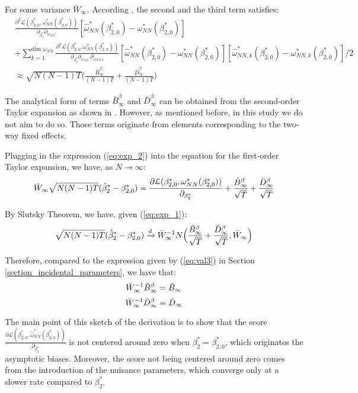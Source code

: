 For some variance $\bar{W}_\infty$. According \cite{fernandez2016individual}, the second and the third term satisfies:
\begin{align} \label{eq:exp_2}
    &\frac{\partial^2 \mathcal{L} ({\beta}_{2,0}^*, {\omega}_{NN}^*(\beta_{2,0}^*)) }{\partial_{\beta_{2}^*}\partial_{\omega_{NN}'} }[ \hat{\omega}_{NN}^* (\beta_{2,0}^*) - \omega_{NN}^* (\beta_{2,0}^*)]  \nonumber\\
    &+ \sum_{k = 1}^{\text{dim } \omega_{NN}} \frac{\partial^3 \mathcal{L} ({\beta}_{2,0}^*, {\omega}_{NN}^*(\beta_{2,0}^*))}{\partial_{\beta_{2}^*}\partial_{\omega_{NN}'}\partial_{\omega_{NN,k}}}[ \hat{\omega}_{NN}^* (\beta_{2,0}^*) - \omega_{NN}^* (\beta_{2,0}^*)] [ \hat{\omega}_{NN,k}^* (\beta_{2,0}^*) - \omega_{NN,k}^* (\beta_{2,0}^*)] / 2 \nonumber \\
    & \approx \sqrt{N(N-1)T} \Big( \frac{\bar{B}^\beta_\infty}{(N-1)T} + \frac{\bar{D}^\beta_\infty}{(N-1)T} \Big)
\end{align}

The analytical form of terms $\bar{B}^\beta_\infty$ and $\bar{D}^\beta_\infty$ can be obtained from the second-order Taylor expansion as shown in \cite{fernandez2016individual}. However, as mentioned before, in this study we do not aim to do so. Those terms originate from elements corresponding to the two-way fixed effects.

Plugging in the expression (\ref{eq:exp_2}) into the equation for the first-order Taylor expansion, we have, as $N \xrightarrow{} \infty$:
\begin{align}
    \Bar{W}_\infty \sqrt{N(N-1)T} (\hat{\beta}_2^* - \beta_{2,0}^*) = \frac{\partial \mathcal{L} ({\beta}_{2,0}^*, {\omega}_{NN}^*(\beta_{2,0}^*))}{\partial_{\beta_{2}^*} }  + \frac{\bar{B}^\beta_\infty}{\sqrt{T}} + \frac{\bar{D}^\beta_\infty}{\sqrt{T}} 
\end{align}

By Slutsky Theorem, we have, given (\ref{eq:exp_1}):
\begin{align}
    \sqrt{N(N-1)T} (\hat{\beta}_2^* - \beta_{2,0}^*) \xrightarrow{d} \Bar{W}_\infty^{-1} N \Big(\frac{\bar{B}^\beta_\infty}{\sqrt{T}} + \frac{\bar{D}^\beta_\infty}{\sqrt{T}} , \Bar{W}_\infty \Big)
\end{align}

Therefore, compared to the expression given by (\ref{eq:val3}) in Section \ref{section_incidental_parameters}, we have that:
$$ \Bar{W}_\infty^{-1} \bar{B}^\beta_\infty = \bar{B}_\infty  $$
$$ \Bar{W}_\infty^{-1} \bar{D}^\beta_\infty =  \bar{D}_\infty  $$

The main point of this sketch of the derivation is to show that the score $\frac{\partial \mathcal{L} ({\beta}_{2,0}^*, \hat{\omega}_{NN}^*(\beta_{2,0}^*))}{\partial_{\beta_2^*}} $ is not centered around zero when $\beta_2^* = \beta_{2,0}^*$, which originates the asymptotic biases. Moreover, the score not being centered around zero comes from the introduction of the nuisance parameters, which converge only at a slower rate compared to $\beta_2^*$.



